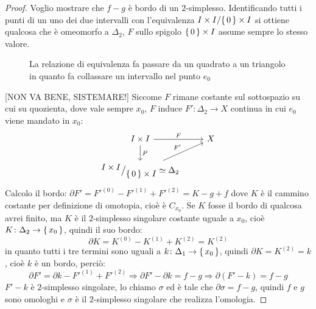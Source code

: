 \begin{proof}
  Voglio mostrare che $ f - g $ è bordo di un $ 2 $-simplesso.
  Identificando tutti i punti di un uno dei due intervalli con l'equivalenza $ {I \times I} \slash {\set{0} \times I} $
  si ottiene qualcosa che è omeomorfo a $ \Delta_2 $, $ F $ sullo spigolo $ \set{0} \times I $
  assume sempre lo stesso valore.
  \begin{figure}[htbp]
    \centering
    \caption{La relazione di equivalenza fa passare da un quadrato a un triangolo
      in quanto fa collassare un intervallo nel punto $ e_0 $}
    \label{fig:lez3:homotopy_f_g_to_triangle}
  \end{figure}
  [NON VA BENE, SISTEMARE!]
  Siccome $ F $ rimane costante sul sottospazio su cui su quozienta,
  dove vale sempre $ x_0 $,
  $ F $ induce $ F' \colon \Delta_2 \to X $ continua in cui $ e_0 $ viene mandato in $ x_0 $:
  \[
    \begin{tikzcd}
      I \times I \arrow{r}{F} \arrow{d}{P} & X \\
      \quot{I \times I}{\set{0} \times I} \simeq \Delta_2 \arrow{ur}{F'}
    \end{tikzcd}
  \]
  Calcolo il bordo: $ \partial F' = F'^{(0)} - F'^{(1)} + F'^{(2)} = K - g + f $
  dove $ K $ è il cammino costante per definizione di omotopia, cioè è
  $ C_{x_0}$. Se $ K $ fosse il bordo di qualcosa avrei finito, ma $ K $ è il
  $ 2 $-simplesso singolare costante uguale a $ x_0 $, cioè
  $ K \colon \Delta_2 \to \set{x_0} $, quindi il suo bordo:
  \[
    \partial K = K^{(0)} - K^{(1)} + K^{(2)} =  K^{(2)}
  \]
  in quanto tutti i tre termini sono uguali a $ k \colon \Delta_1 \to \set{x_0} $, quindi $ \partial K = K^{(2)} = k $,
  cioè $ k $ è un bordo, perciò:
  \[
    \partial F' = \partial k - F'^{(1)} + F'^{(2)} \Rightarrow \partial F' - \partial k = f - g \Rightarrow \partial(F' - k) = f - g
  \]
  $ F' - k $ è $ 2 $-simplesso singolare, lo chiamo $ \sigma $ ed è tale che $ \partial \sigma = f - g $, quindi
  $ f $ e $ g $ sono omologhi e $ \sigma $ è il $ 2 $-simplesso singolare che realizza
  l'omologia.
\end{proof}

